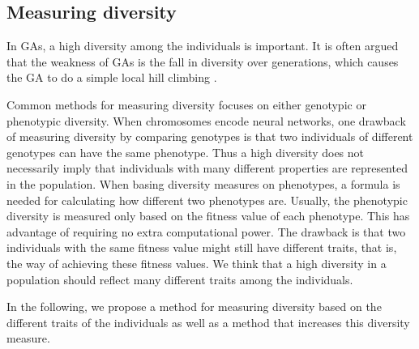 \subsection{Measuring diversity}
In GAs, a high diversity among the individuals is important. It is often argued that the weakness of GAs is the fall in diversity over generations, which causes the GA to do a simple local hill climbing \citpls{}.

Common methods for measuring diversity focuses on either genotypic or phenotypic diversity. When chromosomes encode neural networks, one drawback of measuring diversity by comparing genotypes is that two individuals of different genotypes can have the same phenotype. Thus a high diversity does not necessarily imply that individuals with many different properties are represented in the population.
%
%
When basing diversity measures on phenotypes, a formula is needed for calculating how different two phenotypes are.  Usually, the phenotypic diversity is measured only based on the fitness value of each phenotype.
This has advantage of requiring no extra computational power. The drawback is that two individuals with the same fitness value might still have different traits, that is, the way of achieving these fitness values. We think that a high diversity in a population should reflect many different traits among the individuals.

In the following, we propose a method for measuring diversity based on the different traits of the individuals as well as a method that increases this diversity measure. 

